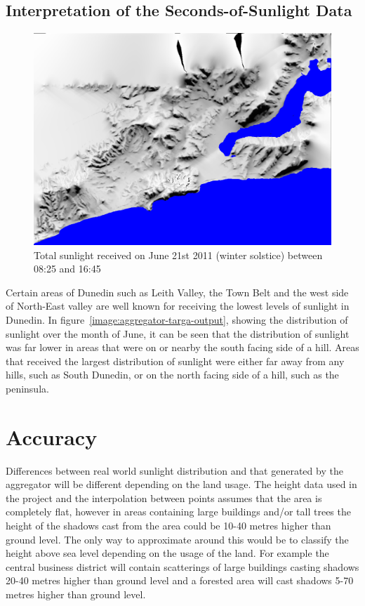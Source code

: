 \documentclass[12pt]{report}
\begin{document}
\subsection{Interpretation of the Seconds-of-Sunlight Data}
\begin{figure}[h]
\centering
\includegraphics[scale=0.25]{wintersolstice.png}
\caption{Total sunlight received on June 21st 2011 (winter solstice) between 08:25 and 16:45}
\label{image:wintersolstice}
\end{figure}

Certain areas of Dunedin such as Leith Valley, the Town Belt and the west side of North-East valley are well known for receiving the lowest levels of sunlight in Dunedin. In figure~\ref{image:aggregator-targa-output}, showing the distribution of sunlight over the month of June, it can be seen that the distribution of sunlight was far lower in areas that were on or nearby the south facing side of a hill. Areas that received the largest distribution of sunlight were either far away from any hills, such as South Dunedin, or on the north facing side of a hill, such as the peninsula.

\section{Accuracy}
Differences between real world sunlight distribution and that generated by the aggregator will be different depending on the land usage. The height data used in the project and the interpolation between points assumes that the area is completely flat, however in areas containing large buildings and/or tall trees the height of the shadows cast from the area could be 10-40 metres higher than ground level. The only way to approximate around this would be to classify the height above sea level depending on the usage of the land. For example the central business district will contain scatterings of large buildings casting shadows 20-40 metres higher than ground level and a forested area will cast shadows 5-70 metres higher than ground level.
\end{document}
